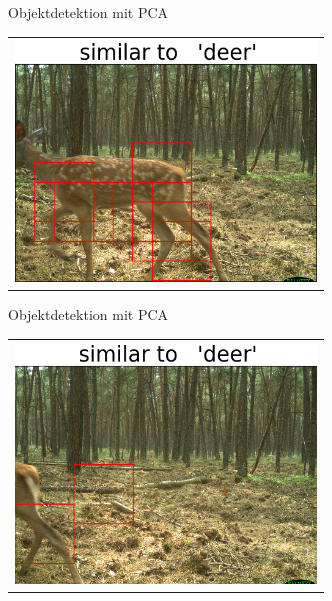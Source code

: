 \begin{frame}[t,fragile]{Objektdetektion mit  PCA}
  \vspace{0.01em}
  {
\begin{table}
\centering
        \begin{tabular}{c}
        \includegraphics[width=8cm]{img/Segmentierung/seg(6).png}\\
         \end{tabular}
\end{table}
 }

\end{frame}


\begin{frame}[t,fragile]{Objektdetektion mit PCA}
  \vspace{0.01em}
  {
\begin{table}
\centering
        \begin{tabular}{c}
        \includegraphics[width=8cm]{img/Segmentierung/seg(7).png}\\
         \end{tabular}
\end{table}
 }

\end{frame}


